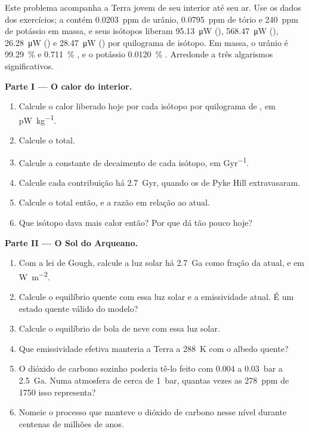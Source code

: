 \begin{problem}\label{pb:b2:precambrian-earth:1}
Este problema acompanha a Terra jovem de seu interior até seu ar. Use os dados dos
exercícios; a  contém \qty{0.0203}{ppm} de urânio, \qty{0.0795}{ppm} de
tório e \qty{240}{ppm} de potássio em massa, e seus isótopos liberam \qty{95.13}{\micro W}
(), \qty{568.47}{\micro W} (), \qty{26.28}{\micro W} () e
\qty{28.47}{\micro W} () por quilograma de isótopo. Em massa, o urânio é
\qty{99.29}{\percent}  e \qty{0.711}{\percent} , e o potássio
\qty{0.0120}{\percent} . Arredonde a três algarismos significativos.

\noindent\textbf{Parte I --- O calor do interior.}
\begin{enumerate}
  \item Calcule o calor liberado hoje por cada isótopo por quilograma de , em
        \unit{pW.kg^{-1}}.
  \item Calcule o total.
  \item Calcule a constante de decaimento de cada isótopo, em \unit{Gyr^{-1}}.
  \item Calcule cada contribuição há \qty{2.7}{Gyr}, quando os  de Pyke Hill extravasaram.
  \item Calcule o total então, e a razão em relação ao atual.
  \item Que isótopo dava mais calor então? Por que dá tão pouco hoje?
\end{enumerate}

\noindent\textbf{Parte II --- O Sol do Arqueano.}
\begin{enumerate}[resume]
  \item Com a lei de Gough, calcule a luz solar há \qty{2.7}{Ga} como fração da atual, e em
        \unit{W.m^{-2}}.
  \item Calcule o equilíbrio quente com essa luz solar e a emissividade atual. É um estado quente
        válido do modelo?
  \item Calcule o equilíbrio de bola de neve com essa luz solar.
  \item Que emissividade efetiva manteria a Terra a \qty{288}{K} com o albedo quente?
  \item O dióxido de carbono sozinho poderia tê-lo feito com 0.004 a \qty{0.03}{bar} a \qty{2.5}{Ga}.
        Numa atmosfera de cerca de \qty{1}{bar}, quantas vezes as \qty{278}{ppm} de 1750
        isso representa?
  \item Nomeie o processo que manteve o dióxido de carbono nesse nível durante centenas de milhões
        de anos.
\end{enumerate}


\end{problem}
